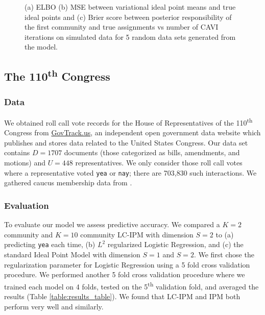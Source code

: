 \documentclass{article}
\begin{document}
\begin{figure}[h]
\begin{subfigure}[b]{0.3\textwidth}
        \caption{}
    \end{subfigure}
  \caption{(a) ELBO (b) MSE between variational ideal point means and true ideal points and (c) Brier score between posterior responsibility of the first community and true assignments vs number of CAVI iterations on simulated data for 5 random data sets generated from the model.}
      \label{fig:toy_results}
\end{figure}
\subsection{The 110\textsuperscript{th} Congress}
\subsubsection{Data}
We obtained roll call vote records for the House of Representatives of the 110\textsuperscript{th} Congress from \href{www.govtrack.us}{GovTrack.us}, an independent open government data website which publishes and stores data related to the United States Congress. Our data set contains $D=1707$ documents (those categorized as bills, amendments, and motions) and $U=448$ representatives. We only consider those roll call votes where a representative voted \texttt{yea} or \texttt{nay}; there are 703,830 such interactions. We gathered caucus membership data from \cite{Victor2013}.
\subsubsection{Evaluation} 
To evaluate our model we assess predictive accuracy. We compared a $K=2$ community and $K=10$ community LC-IPM with dimension $S=2$ to (a) predicting \texttt{yea} each time, (b) $L^2$ regularized Logistic Regression, and (c) the standard Ideal Point Model with dimension $S=1$ and $S=2$. We first chose the regularization parameter for Logistic Regression using a 5 fold cross validation procedure. We performed another 5 fold cross validation procedure where we trained each model on 4 folds, tested on the 5\textsuperscript{th} validation fold, and averaged the results (Table \ref{table:results_table}). We found that LC-IPM and IPM both perform very well and similarly.
\end{document}
